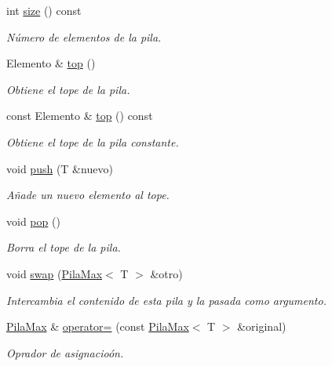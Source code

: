 \begin{DoxyCompactItemize}
\mbox{\label{classPilaMax_a17d84be973a9df1e1ee51e87df045348}} 
int \hyperlink{classPilaMax_a17d84be973a9df1e1ee51e87df045348}{size} () const
\begin{DoxyCompactList}\small\item\em Número de elementos de la pila. \end{DoxyCompactList}\item 
Elemento \& \hyperlink{classPilaMax_a8ededbe2b2180656cdbaa0a0a437fb65}{top} ()
\begin{DoxyCompactList}\small\item\em Obtiene el tope de la pila. \end{DoxyCompactList}\item 
const Elemento \& \hyperlink{classPilaMax_a73ea1d2e5b631b551613b2b3e2d884f3}{top} () const
\begin{DoxyCompactList}\small\item\em Obtiene el tope de la pila constante. \end{DoxyCompactList}\item 
void \hyperlink{classPilaMax_a8d444d7757bf2fd488d5ed8f34a942e0}{push} (T \&nuevo)
\begin{DoxyCompactList}\small\item\em Añade un nuevo elemento al tope. \end{DoxyCompactList}\item 
\mbox{\label{classPilaMax_ae85a974bede13446dd9e99608f848d83}} 
void \hyperlink{classPilaMax_ae85a974bede13446dd9e99608f848d83}{pop} ()
\begin{DoxyCompactList}\small\item\em Borra el tope de la pila. \end{DoxyCompactList}\item 
void \hyperlink{classPilaMax_a9736ed6ed710fc403dc2d5590a0032ae}{swap} (\hyperlink{classPilaMax}{Pila\+Max}$<$ T $>$ \&otro)
\begin{DoxyCompactList}\small\item\em Intercambia el contenido de esta pila y la pasada como argumento. \end{DoxyCompactList}\item 
\hyperlink{classPilaMax}{Pila\+Max} \& \hyperlink{classPilaMax_a4a2247953a5c68c37eb0f56440988e87}{operator=} (const \hyperlink{classPilaMax}{Pila\+Max}$<$ T $>$ \&original)
\begin{DoxyCompactList}\small\item\em Oprador de asignacioón. \end{DoxyCompactList}\end{DoxyCompactItemize}


